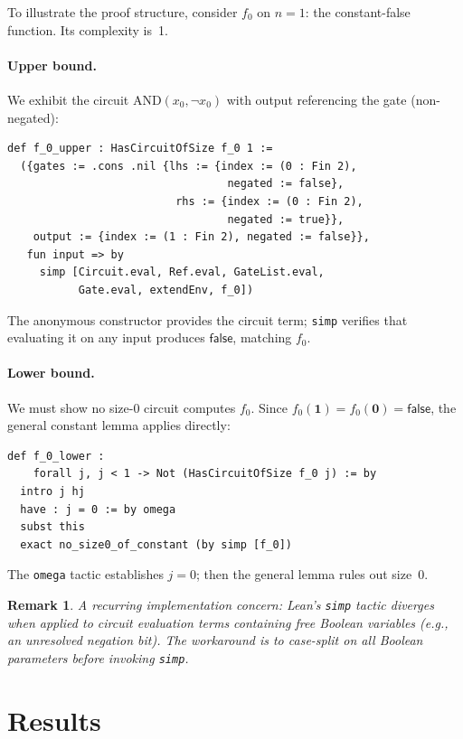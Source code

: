 \documentclass[11pt]{article}
\newtheorem{remark}[theorem]{Remark}
\begin{document}
To illustrate the proof structure, consider $f_0$ on $n = 1$: the
constant-false function. Its complexity is~1.

\paragraph{Upper bound.} We exhibit the circuit
$\text{AND}(x_0, \lnot x_0)$ with output referencing the gate (non-negated):

\begin{lstlisting}
def f_0_upper : HasCircuitOfSize f_0 1 :=
  ({gates := .cons .nil {lhs := {index := (0 : Fin 2),
                                  negated := false},
                          rhs := {index := (0 : Fin 2),
                                  negated := true}},
    output := {index := (1 : Fin 2), negated := false}},
   fun input => by
     simp [Circuit.eval, Ref.eval, GateList.eval,
           Gate.eval, extendEnv, f_0])
\end{lstlisting}

The anonymous constructor provides the circuit term; \texttt{simp} verifies
that evaluating it on any input produces $\mathsf{false}$, matching $f_0$.

\paragraph{Lower bound.} We must show no size-0 circuit computes $f_0$. Since
$f_0(\mathbf{1}) = f_0(\mathbf{0}) = \mathsf{false}$, the general constant
lemma applies directly:

\begin{lstlisting}
def f_0_lower :
    forall j, j < 1 -> Not (HasCircuitOfSize f_0 j) := by
  intro j hj
  have : j = 0 := by omega
  subst this
  exact no_size0_of_constant (by simp [f_0])
\end{lstlisting}

\noindent The \texttt{omega} tactic establishes $j = 0$; then
the general lemma rules out size~0.

\begin{remark}
A recurring implementation concern: Lean's \texttt{simp} tactic diverges when
applied to circuit evaluation terms containing free Boolean variables (e.g., an
unresolved negation bit). The workaround is to case-split on all Boolean
parameters \emph{before} invoking \texttt{simp}.
\end{remark}

\section{Results}
\end{document}
